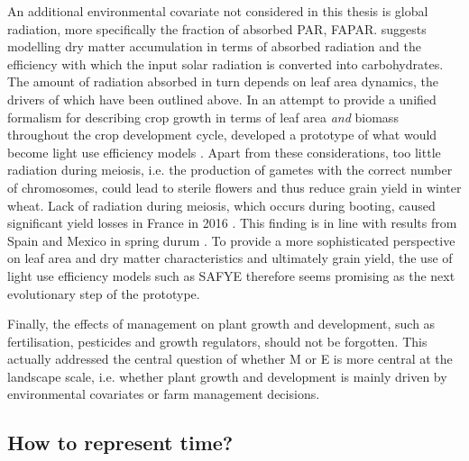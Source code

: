 An additional environmental covariate not considered in this thesis is global radiation, more specifically the fraction of absorbed \gls{PAR}, FAPAR. \cite{monteith_climate_1977} suggests modelling dry matter accumulation in terms of absorbed radiation and the efficiency with which the input solar radiation is converted into carbohydrates. The amount of radiation absorbed in turn depends on leaf area dynamics, the drivers of which have been outlined above. In an attempt to provide a unified formalism for describing crop growth in terms of leaf area \textsl{and} biomass throughout the crop development cycle, \cite{goudriaan_mathematical_1990} developed a prototype of what would become light use efficiency models \citep{gitelson_productivity_2015}. Apart from these considerations, too little radiation during meiosis, i.e. the production of gametes with the correct number of chromosomes, could lead to sterile flowers and thus reduce grain yield in winter wheat. Lack of radiation during meiosis, which occurs during booting, caused significant yield losses in France in 2016 \citep{le_gouis_how_2020}. This finding is in line with results from Spain and Mexico in spring durum \citep{villegas_daylength_2016}. To provide a more sophisticated perspective on leaf area and dry matter characteristics and ultimately grain yield, the use of light use efficiency models such as \gls{SAFYE} \citep{ma_wheat_2022} therefore seems promising as the next evolutionary step of the prototype.

Finally, the effects of management on plant growth and development, such as fertilisation, pesticides and growth regulators, should not be forgotten. This actually addressed the central question of whether M or E is more central at the landscape scale, i.e. whether plant growth and development is mainly driven by environmental covariates or farm management decisions.

\subsection{How to represent time?}

